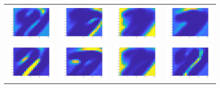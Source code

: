 \documentclass{article} %
\begin{document}
\begin{figure}[H]
\begin{tabular}{cccc}
\\
\includegraphics[width=0.2\linewidth]{images/Fig_act_9.png}
&
\includegraphics[width=0.2\linewidth]{images/Fig_act_10.png}
&
\includegraphics[width=0.2\linewidth]{images/Fig_act_11.png}
&
\includegraphics[width=0.2\linewidth]{images/Fig_act_12.png}
\\
\includegraphics[width=0.2\linewidth]{images/Fig_act_13.png}
&
\includegraphics[width=0.2\linewidth]{images/Fig_act_14.png}
&
\includegraphics[width=0.2\linewidth]{images/Fig_act_15.png}
&
\includegraphics[width=0.2\linewidth]{images/Fig_act_16.png}
\\

\end{tabular}
\end{figure}
\end{document}
